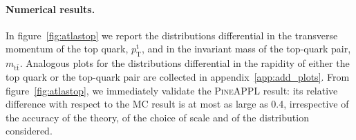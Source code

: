 \paragraph{Numerical results.}

In figure~\ref{fig:atlastop} we report the
distributions differential in the transverse momentum of the top quark,
$p_\mathrm{T}^\mathrm{t}$, and in the invariant mass of the top-quark pair,
$m_{\mathrm{t}\bar{\mathrm{t}}}$. Analogous plots for the distributions differential
in the rapidity of either the top quark or the top-quark pair are collected in
appendix~\ref{app:add_plots}. From figure~\ref{fig:atlastop}, we immediately
validate the \textsc{PineAPPL} result: its relative difference with respect to
the MC result is at most as large as \SI{0.4}{\permille}, irrespective of the
accuracy of the theory, of the choice of scale and of the distribution
considered.

